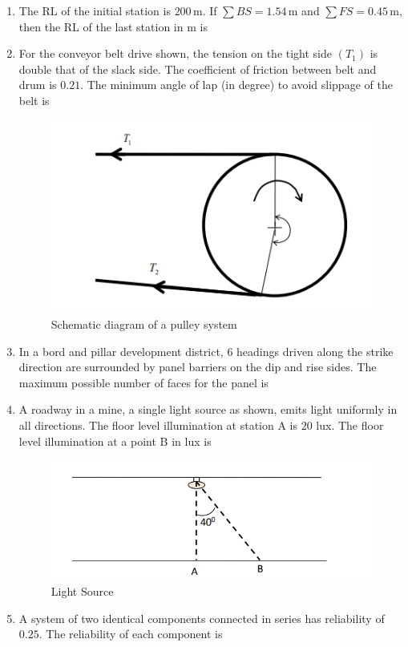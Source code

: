 \documentclass[journal,12pt,onecolumn]{IEEEtran}
\theoremstyle{remark}
\begin{document}
\begin{enumerate}
\hfill{}
\item The RL of the initial station is $200 \, \text{m}$. If $\sum BS = 1.54 \, \text{m}$ and $\sum FS = 0.45 \, \text{m}$, then the RL of the last station in m is 

\item For the conveyor belt drive shown, the tension on the tight side $(T_1)$ is double that of the slack side. The coefficient of friction between belt and drum is $0.21$. The minimum angle of lap (in degree) to avoid slippage of the belt is

\hfill{}

\begin{figure}[H]
  \centering
  \includegraphics[width=0.4\columnwidth]{figs/figure.png}
  \caption{Schematic diagram of a pulley system}
  \label{fig:figure}
\end{figure}

\item In a bord and pillar development district, 6 headings driven along the strike direction are
surrounded by panel barriers on the dip and rise sides. The maximum possible number of faces for the panel is

\hfill{}
\item A roadway in a mine, a single light source as shown, emits light uniformly in all directions. The floor level illumination at station A is $20$ lux. The floor level illumination at a point B in lux is 
\begin{figure}[H]
  \centering
  \includegraphics[width=0.4\columnwidth]{figs/source.png}
  \caption{Light Source}
  \label{fig:Ls}
\end{figure}
\hfill{}
\item A system of two identical components connected in series has reliability of $0.25$. The reliability of each component is
\hfill{}


\end{enumerate}
\end{document}
